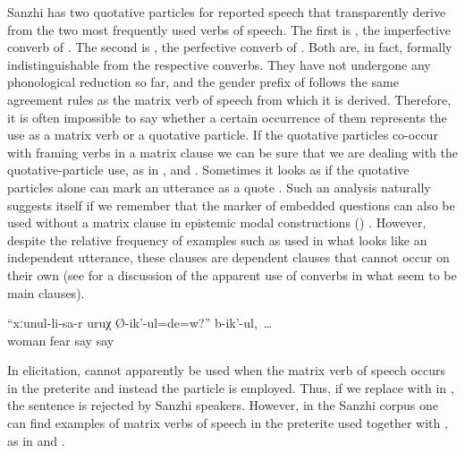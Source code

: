 Sanzhi has two quotative particles for reported speech that transparently derive from the two most frequently used verbs of speech. The first is , the imperfective converb of . The second is , the perfective converb of . Both are, in fact, formally indistinguishable from the respective converbs. They have not undergone any phonological reduction so far, and the gender prefix of  follows the same agreement rules as the matrix verb of speech from which it is derived. Therefore, it is often impossible to say whether a certain occurrence of them represents the use as a matrix verb or a quotative particle. If the quotative particles co-occur with framing verbs in a matrix clause we can be sure that we are dealing with the quotative-particle use, as in ,  and . Sometimes it looks as if the quotative particles alone can mark an utterance as a quote . Such an analysis naturally suggests itself if we remember that the marker of embedded questions can also be used without a matrix clause in epistemic modal constructions () \citep{ForkerLTSanzhi}. However, despite the relative frequency of examples such as  used in what looks like an independent utterance, these clauses are dependent clauses that cannot occur on their own (see  for a discussion of the apparent use of converbs in what seem to be main clauses).
%
\begin{exe}
	\ex	\label{ex:Are you afraid of your wife?, they say and}
	\gll	``xːunul-li-sa-r	uruχ	Ø-ik'-ul=de=w?''	b-ik'-ul,~\ldots\\
		woman	fear	say	say\\
	\glt	{}
\end{exe}

In elicitation,  cannot apparently be used when the matrix verb of speech occurs in the preterite and instead the particle  is employed. Thus, if we replace  with  in , the sentence is rejected by Sanzhi speakers. However, in the Sanzhi corpus one can find examples of matrix verbs of speech in the preterite used together with , as in  and .

